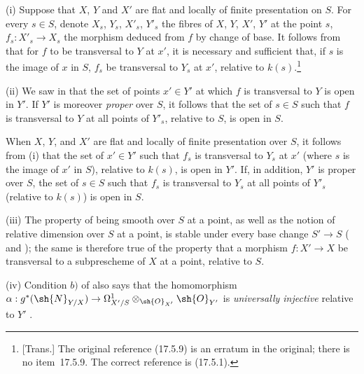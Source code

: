 \begin{remarks}[17.13.4]
\label{IV.17.13.4}
(i)
Suppose that $X$, $Y$ and $X'$ are flat and locally of finite presentation on $S$.
For every $s\in S$, denote $X_s$, $Y_s$, $X'_s$, $Y'_s$ the fibres of $X$, $Y$, $X'$, $Y'$ at the point $s$, $f_s:X'_s\to X_s$ the morphism deduced from $f$ by change of base.
It follows from  that for $f$ to be transversal to $Y$ at $x'$, it is necessary and sufficient that, if $s$ is the image of $x$ in $S$, $f_s$ be transversal to $Y_s$ at $x'$, relative to $k(s)$.\footnote{[Trans.] The original reference (17.5.9) is an erratum in the original; there is no item~17.5.9. The correct reference is (17.5.1).}

(ii)
We saw in  that the set of points $x'\in Y'$ at which $f$ is transversal to $Y$ is open in $Y'$.
If $Y'$ is moreover \emph{proper} over $S$, it follows that the set of $s\in S$ such that $f$ is transversal to $Y$ at all points of $Y'_s$, relative to $S$, is open in $S$.

When $X$, $Y$, and $X'$ are flat and locally of finite presentation over $S$, it follows from (i) that the set of $x'\in Y'$ such that $f_s$ is transversal to $Y_s$ at $x'$ (where $s$ is the image of $x'$ in $S$), relative to $k(s)$, is open in $Y'$.
If, in addition, $Y'$ is proper over $S$, the set of $s\in S$ such that $f_s$ is transversal to $Y_s$ at all points of $Y'_s$ (relative to $k(s)$) is open in $S$.

(iii)
The property of being smooth over $S$ at a point, as well as the notion of relative dimension over $S$ at a point, is stable under every base change $S'\to S$ ( and ); the same is therefore true of the property that a morphism $f:X'\to X$ be transversal to a subprescheme of $X$ at a point, relative to $S$.

(iv)
Condition $b)$ of  also says that the homomorphism
$\alpha:g^*(\sh{N}_{Y/X})\to\Omega^1_{X'/S}\otimes_{\sh{O}_{X'}}\sh{O}_{Y'}$
is \emph{universally injective} relative to $Y'$ .
\end{remarks}


